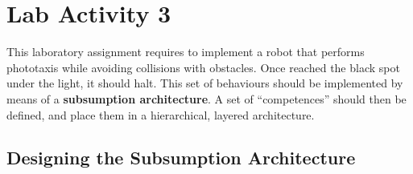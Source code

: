 \section{Lab Activity 3}

This laboratory assignment requires to implement a robot that performs
phototaxis while avoiding collisions with obstacles. Once reached the black
spot under the light, it should halt. This set of behaviours should be
implemented by means of a \textbf{subsumption architecture}. A set of
``competences'' should then be defined, and place them in a hierarchical,
layered architecture.

\subsection{Designing the Subsumption Architecture}

